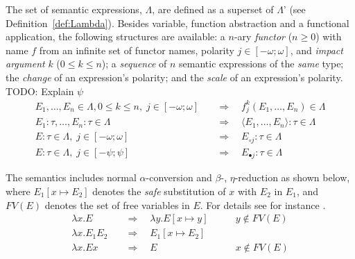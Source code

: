 \begin{definition}
The set of semantic expressions, $\Lambda$, are defined as a superset of $\Lambda$' (see Definition~\ref{def:Lambda}). Besides variable, function abstraction and a functional application, the following structures are available: a $n$-ary \emph{functor} ($n \geq 0$) with name $f$ from an infinite set of functor names, polarity $j \in [-\omega;\omega]$, and \emph{impact argument} $k$ ($0 \leq k \leq n$); a \emph{sequence} of $n$ semantic expressions of the \emph{same} type; the \emph{change} of an expression's polarity; and the \emph{scale} of an expression's polarity. TODO: Explain $\psi$
\begin{align}
 E_1, \ldots, E_n \in \Lambda, 0 \leq k \leq n, \; j \in [-\omega;\omega]         &\quad \Rightarrow \quad f^k_j(E_1, \ldots, E_n) \in \Lambda \tag{Functor} \\
 E_1 : \tau, \ldots, E_n : \tau \in \Lambda     &\quad \Rightarrow \quad  \langle E_1, \ldots, E_n \rangle  : \tau \in \Lambda \tag{Sequence} \\
 E : \tau \in \Lambda, \; j \in [-\omega;\omega]      &\quad \Rightarrow \quad  E_{\circ
 j}  : \tau \in \Lambda \tag{Change}  \\ 
 E : \tau \in \Lambda, \; j \in [-\psi;\psi]      &\quad \Rightarrow \quad  E_{\bullet j}  : \tau \in \Lambda \tag{Scale} 
\end{align}

The semantics includes normal $\alpha$-conversion and $\beta$-, $\eta$-reduction as shown below, where $E_1[x \mapsto E_2]$ denotes the \emph{safe} substitution of $x$ with $E_2$ in $E_1$, and $\mathit{FV}(E)$ denotes the set of free variables in $E$. For details see for instance \cite{}.
\begin{align}
 \lambda x . E &\quad \Rightarrow \quad \lambda y . E[x \mapsto y]
 \tag{$\alpha$-conversion} \quad\quad &y \not \in FV(E) \\
 \lambda x . E_1 E_2 &\quad \Rightarrow \quad E_1[x \mapsto E_2]
 \tag{$\beta$-reduction} \\
\lambda x . E x &\quad \Rightarrow \quad E
 \tag{$\eta$-reduction} \quad\quad &x \not \in FV(E) 
\end{align}


\end{definition}
